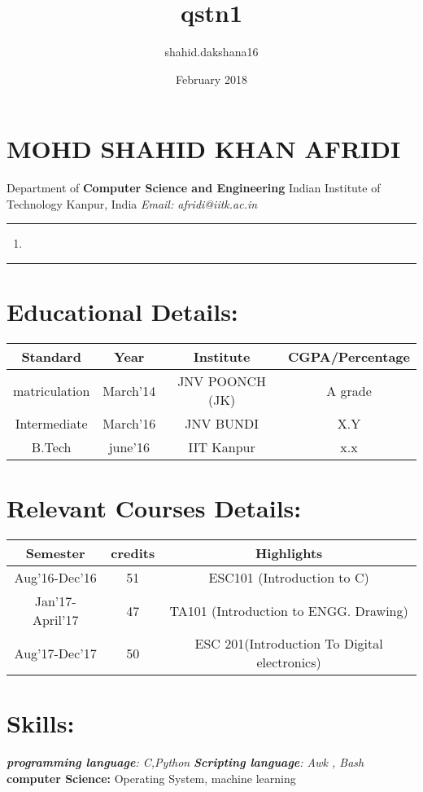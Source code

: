 \documentclass{article}
\title{qstn1}
\author{shahid.dakshana16 }
\date{February 2018}
\newcommand{\doublerule}[1][.4pt]{%
  \noindent
  \makebox[0pt][l]{\rule[1.1ex]{\linewidth}{#1}}%
  \rule[.3ex]{\linewidth}{#1}}
\begin{document}
\section*{MOHD SHAHID KHAN AFRIDI}
Department of \textbf{Computer Science and Engineering}\newline
Indian Institute of Technology Kanpur, India\newline
\textit{Email: afridi@iitk.ac.in}\newline
\noindent
\doublerule
\begin{enumerate}
    \item \lipsum[10]
\end{enumerate}
\doublerule
\section*{Educational Details:}
\begin{tabular}{|c|c|c|c|}
\hline
    \textbf{Standard} &\textbf{ Year} & \textbf{Institute} & \textbf{CGPA/Percentage}\\
\hline
matriculation & March'14 & JNV POONCH (JK) & A grade\\
\hline
Intermediate & March'16 & JNV BUNDI & X.Y\\
\hline
B.Tech & june'16 & IIT Kanpur & x.x\\
\hline
\end{tabular}
\section*{Relevant Courses Details:}
\begin{tabular}{|c|c|c|}
\hline
    \textbf{Semester        } &\textbf{ credits   } & \textbf{Highlights           }\\
\hline
Aug'16-Dec'16 & 51 & ESC101 (Introduction to C)\\
\hline
Jan'17-April'17 & 47 & TA101 (Introduction to ENGG. Drawing)\\
\hline
Aug'17-Dec'17 & 50  & ESC 201(Introduction To Digital electronics)\\
\hline
\end{tabular}
\section*{Skills:}
\textit{\textbf{programming language}: \emph{C,Python} }
\textit{\textbf{Scripting language}: \emph{Awk , Bash} }\newline
\textbf{computer Science: }Operating System, machine learning
\end{document}
